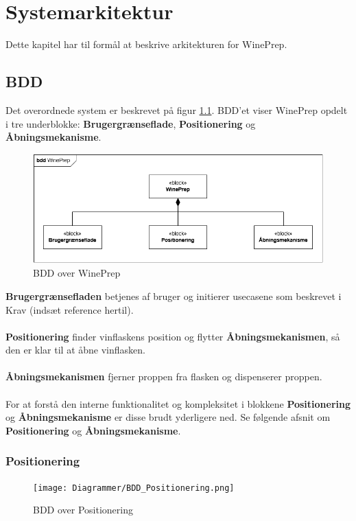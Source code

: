 \chapter{Systemarkitektur}
Dette kapitel har til formål at beskrive arkitekturen for WinePrep.

\section{BDD}
Det overordnede system er beskrevet på figur \ref{BDD_WinePrepPNG}. BDD'et viser WinePrep opdelt i tre underblokke: \textbf{Brugergrænseflade}, \textbf{Positionering} og \textbf{Åbningsmekanisme}.

\begin{figure}[H]
	\centerline{\includegraphics[scale=0.4]{Diagrammer/BDD_WinePrep.png}}
	\caption{BDD over WinePrep}
	\label{BDD_WinePrepPNG}
\end{figure}

\noindent\textbf{Brugergrænsefladen} betjenes af bruger og initierer usecasene som beskrevet i Krav (indsæt reference hertil).
\\
\\
\textbf{Positionering} finder vinflaskens position og flytter \textbf{Åbningsmekanismen}, så den er klar til at åbne vinflasken.
\\
\\
\textbf{Åbningsmekanismen} fjerner proppen fra flasken og dispenserer proppen.
\\
\\
For at forstå den interne funktionalitet og kompleksitet i blokkene \textbf{Positionering} og \textbf{Åbningsmekanisme} er disse brudt yderligere ned. Se følgende afsnit om \textbf{Positionering} og \textbf{Åbningsmekanisme}.

\subsection{Positionering}
\begin{figure}[H]
	\centerline{\texttt{[image: Diagrammer/BDD\_Positionering.png]}}
	\caption{BDD over Positionering}
	\label{BDD_Positionering}
\end{figure}

